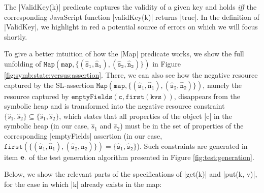 The \jsinline|ValidKey(k)| predicate captures the validity of a given key and holds \emph{iff} the corresponding JavaScript function \jsinline|validKey(k)| returns \jsinline|true|.
In the definition of \jsinline|ValidKey|, we highlight in red a potential source of errors on which we will focus shortly.

To give a better intuition of how the \jsinline|Map| predicate works, we show the full unfolding of {\small$\mathtt{Map(map, \{ (\hat{s}_1, \hat{n}_1), (\hat{s}_2, \hat{n}_2) \} )}$} in Figure \ref{fig:symb:state:versus:assertion}.
%
%
There, we can also see how the negative resource captured by the SL-assertion {\small$\mathtt{Map(map, \{ (\hat{s}_1, \hat{n}_1), (\hat{s}_2, \hat{n}_2) \} )}$}, namely the resource captured by {\small$\mathtt{emptyFields(c, first(kvs))}$}, disappears from the symbolic heap and is transformed into the negative resource constraint $\{ \hat{s}_1, \hat{s}_2 \} \subseteq \{ \hat{s}_1, \hat{s}_2 \}$, which states that all properties of the object \jsinline|c| in the symbolic heap (in our case, $\hat{s}_1$ and $\hat{s}_2$) must be in the set of properties of the corresponding \jsinline|emptyFields| assertion (in our case, {\small$\mathtt{first(\{ (\hat{s}_1, \hat{n}_1), (\hat{s}_2, \hat{n}_2) \}) = \{ \hat{s}_1, \hat{s}_2 \}}$}).
Such constraints are generated in item ${\bf e.}$ of the test generation algorithm presented in Figure \ref{fig:test:generation}. 

Below, we show the relevant parts of the specifications of \jsinline|get(k)| and \jsinline|put(k, v)|, for the case in which
 \jsinline|k| already exists in the map:

